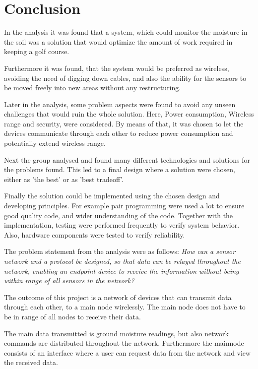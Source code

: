 \section{Conclusion}
In the analysis it was found that a system, which could monitor the moisture in the soil was a solution that would optimize the amount of work required in keeping a golf course.

Furthermore it was found, that the system would be preferred as wireless, avoiding the need of digging down cables, and also the ability for the sensors to be moved freely into new areas without any restructuring.

Later in the analysis, some problem aspects were found to avoid any unseen challenges that would ruin the whole solution. Here, Power consumption, Wireless range and security, were considered. By means of that, it was chosen to let the devices communicate through each other to reduce power consumption and potentially extend wireless range.

Next the group analysed and found many different technologies and solutions for the problems found. This led to a final design where a solution were chosen, either as 'the best' or as 'best tradeoff'.

Finally the solution could be implemented using the chosen design and developing principles. For example pair programming were used a lot to ensure good quality code, and wider understanding of the code. Together with the implementation, testing were performed frequently to verify system behavior. Also, hardware components were tested to verify reliability.

The problem statement from the analysis were as follows:
\textit{How can a sensor network and a protocol be designed, so that data can be relayed throughout the network, enabling an endpoint device to receive the information without being within range of all sensors in the network?}

The outcome of this project is a network of devices that can transmit data through each other, to a main node wirelessly. The main node does not have to be in range of all nodes to receive their data.

The main data transmitted is ground moisture readings, but also network commands are distributed throughout the network. Furthermore the mainnode consists of an interface where a user can request data from the network and view the received data.